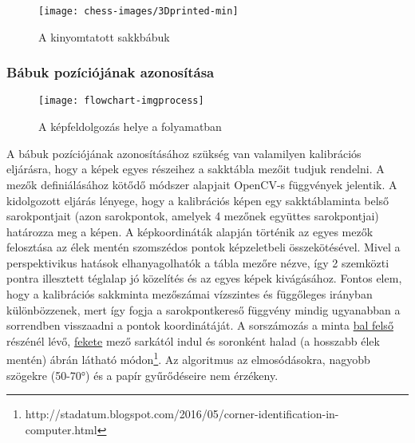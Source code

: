 \documentclass[../documentation.tex]{subfiles}
\begin{document}
\begin{figure}
\centering
\texttt{[image: chess-images/3Dprinted-min]}
\caption{A kinyomtatott sakkbábuk}
\label{fig:3dprinted}
\end{figure}

\subsubsection{Bábuk pozíciójának azonosítása}

\begin{figure}[h]
\centering
\texttt{[image: flowchart-imgprocess]}
\caption{A képfeldolgozás helye a folyamatban}
\label{fig:flowchart-imgprocess}
\end{figure}

A bábuk pozíciójának azonosításához szükség van valamilyen kalibrációs eljárásra, hogy a képek egyes részeihez a sakktábla mezőit tudjuk rendelni. A mezők definiálásához kötődő módszer alapjait OpenCV-s függvények jelentik. A kidolgozott eljárás lényege, hogy a kalibrációs képen egy sakktáblaminta belső sarokpontjait (azon sarokpontok, amelyek 4 mezőnek együttes sarokpontjai) határozza meg a képen. A képkoordináták alapján történik az egyes mezők felosztása az élek mentén szomszédos pontok képzeletbeli összekötésével. Mivel a perspektivikus hatások elhanyagolhatók a tábla mezőre nézve, így 2 szemközti pontra illesztett téglalap jó közelítés és az egyes képek kivágásához. Fontos elem, hogy a kalibrációs sakkminta mezőszámai vízszintes és függőleges irányban különbözzenek, mert így fogja a sarokpontkereső függvény mindig ugyanabban a sorrendben visszaadni a pontok koordinátáját. A sorszámozás a minta \underline{bal felső} részénél lévő, \underline{fekete} mező sarkától indul és soronként halad (a hosszabb élek mentén)  ábrán látható módon\footnote{http://stadatum.blogspot.com/2016/05/corner-identification-in-computer.html}. Az algoritmus az elmosódásokra, nagyobb szögekre (50-70°) és a papír gyűrődéseire nem érzékeny.
\end{document}
